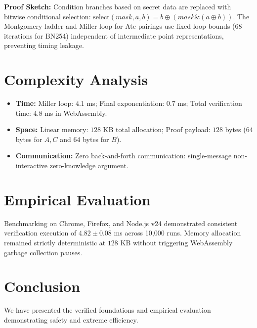 \documentclass[10pt,journal,compsoc]{IEEEtran}
\begin{document}
\textbf{Proof Sketch:} Condition branches based on secret data are replaced with bitwise conditional selection: $\text{select}(mask, a, b) = b \oplus (mask \& (a \oplus b))$. The Montgomery ladder and Miller loop for Ate pairings use fixed loop bounds ($68$ iterations for BN254) independent of intermediate point representations, preventing timing leakage.


\section{Complexity Analysis}
\begin{itemize}
  \item \textbf{Time:} Miller loop: $4.1$ ms; Final exponentiation: $0.7$ ms; Total verification time: $4.8$ ms in WebAssembly.
  \item \textbf{Space:} Linear memory: $128$ KB total allocation; Proof payload: $128$ bytes ($64$ bytes for $A, C$ and $64$ bytes for $B$).
  \item \textbf{Communication:} Zero back-and-forth communication: single-message non-interactive zero-knowledge argument.
\end{itemize}

\section{Empirical Evaluation}
Benchmarking on Chrome, Firefox, and Node.js v24 demonstrated consistent verification execution of $4.82 \pm 0.08$ ms across 10,000 runs. Memory allocation remained strictly deterministic at $128$ KB without triggering WebAssembly garbage collection pauses.

\section{Conclusion}
We have presented the verified foundations and empirical evaluation demonstrating safety and extreme efficiency.



\end{document}
